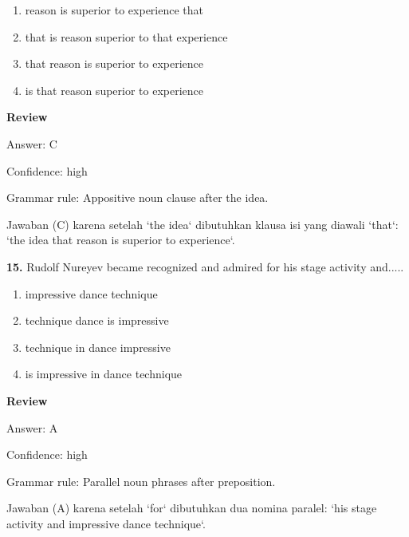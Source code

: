 \documentclass[12pt]{article}
\begin{document}
\begin{enumerate}[label=(\Alph*),leftmargin=*,itemsep=0.2em]
\item reason is superior to experience that
\item that is reason superior to that experience
\item that reason is superior to experience
\item is that reason superior to experience
\end{enumerate}
\par
\begingroup
\setlength{\parskip}{0pt}
\setlength{\parindent}{0pt}
\textbf{Review}\par
Answer: C\par
Confidence: high\par
Grammar rule: Appositive noun clause after the idea.\par
Jawaban (C) karena setelah `the idea` dibutuhkan klausa isi yang diawali `that`: `the idea that reason is superior to experience`.\par
\endgroup
\par
\vspace{0.25\baselineskip}
\noindent\textbf{15.} Rudolf Nureyev became recognized and admired for his stage activity and.....
\begin{enumerate}[label=(\Alph*),leftmargin=*,itemsep=0.2em]
\item impressive dance technique
\item technique dance is impressive
\item technique in dance impressive
\item is impressive in dance technique
\end{enumerate}
\par
\begingroup
\setlength{\parskip}{0pt}
\setlength{\parindent}{0pt}
\textbf{Review}\par
Answer: A\par
Confidence: high\par
Grammar rule: Parallel noun phrases after preposition.\par
Jawaban (A) karena setelah `for` dibutuhkan dua nomina paralel: `his stage activity and impressive dance technique`.\par
\endgroup
\par
\vspace{0.25\baselineskip}
\end{document}
